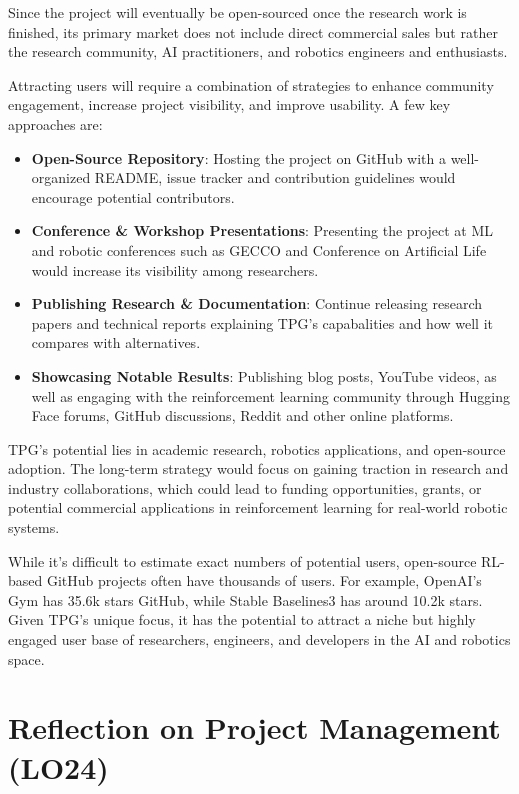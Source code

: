 \documentclass{article}
\begin{document}
Since the project will eventually be open-sourced once the research work is finished, its primary market does
not include direct commercial sales but rather the research community, AI practitioners, and robotics engineers 
and enthusiasts. 

Attracting users will require a combination of strategies to enhance community engagement,
increase project visibility, and improve usability. A few key approaches are:

\begin{itemize}
    \item \textbf{Open-Source Repository}: Hosting the project on GitHub with a well-organized README, issue tracker and contribution
        guidelines would encourage potential contributors.
    \item \textbf{Conference \& Workshop Presentations}: Presenting the project at ML and robotic conferences such as GECCO and Conference
        on Artificial Life would increase its visibility among researchers.
    \item \textbf{Publishing Research \& Documentation}: Continue releasing research papers and technical reports explaining TPG's 
        capabalities and how well it compares with alternatives.
    \item \textbf{Showcasing Notable Results}: Publishing blog posts, YouTube videos, as well as engaging with the reinforcement learning community
        through Hugging Face forums, GitHub discussions, Reddit and other online platforms. 
\end{itemize}

TPG's potential lies in academic research, robotics applications, and open-source adoption. The long-term strategy 
would focus on gaining traction in research and industry collaborations, which could lead to funding opportunities, 
grants, or potential commercial applications in reinforcement learning for real-world robotic systems.

While it's difficult to estimate exact numbers of potential users, open-source RL-based GitHub projects often have
thousands of users. For example, OpenAI's Gym has 35.6k stars GitHub, while Stable Baselines3 has around 10.2k stars. Given 
TPG's unique focus, it has the potential to attract a niche but highly engaged user base of researchers, engineers, 
and developers in the AI and robotics space.

\section{Reflection on Project Management (LO24)}
\end{document}
